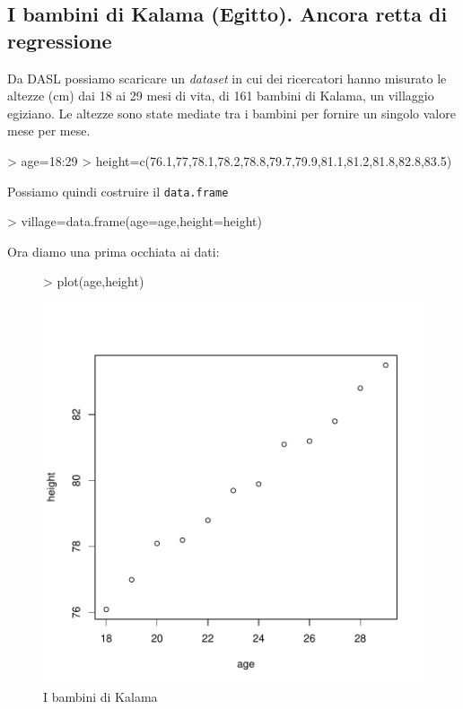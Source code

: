 \documentclass[onecolumn,12pt]{book}
\begin{document}
\subsection{I bambini di Kalama (Egitto). Ancora retta di regressione}
Da DASL \cite{DASL} possiamo scaricare un \emph{dataset} in cui dei ricercatori hanno misurato le altezze (cm) dai 18 ai 29 mesi di vita, di 161 bambini di Kalama, un villaggio egiziano. Le altezze sono state mediate tra i bambini per fornire un singolo valore mese per mese.
\begin{Schunk}
\begin{Sinput}
> age=18:29
> height=c(76.1,77,78.1,78.2,78.8,79.7,79.9,81.1,81.2,81.8,82.8,83.5)
\end{Sinput}
\end{Schunk}
Possiamo quindi costruire il \texttt{data.frame}
\begin{Schunk}
\begin{Sinput}
> village=data.frame(age=age,height=height)
\end{Sinput}
\end{Schunk}
Ora diamo una prima occhiata ai dati:
\begin{figure}[htbp]
\begin{center}
\begin{Schunk}
\begin{Sinput}
> plot(age,height)
\end{Sinput}
\end{Schunk}
\includegraphics{RbookParte2-053}
\caption{I bambini di Kalama}
\label{kalama}
\end{center}
\end{figure}
\end{document}
